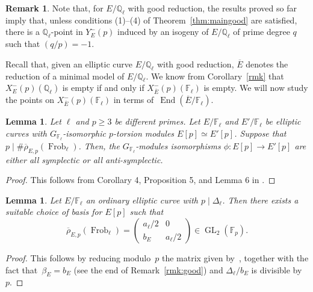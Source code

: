 \documentclass[12pt]{amsart}
\numberwithin{equation}{section}
\newtheorem{lemma}[equation]{Lemma}
\theoremstyle{definition}
\newtheorem{remark}[equation]{Remark}
\newcommand{\F}{\mathbb{F}}
\newcommand{\Q}{\mathbb{Q}}
\newcommand{\rhobar}{{\overline{\rho}}}
\newcommand{\Xp}{X_E^{-}(p)}
\DeclareMathOperator{\GL}{GL}
\DeclareMathOperator{\Frob}{Frob}
\DeclareMathOperator{\End}{End}
\newcommand{\oE}{\overline{E}}
\begin{document}
\begin{remark} \label{rem:isogenies}
Note that, for $E/\Q_\ell$ with good reduction, the results proved so far imply that, unless conditions (1)--(4) of Theorem~\ref{thm:maingood} are satisfied, there is a $\Q_\ell$-point in $Y_E^-(p)$ induced by an isogeny of $E/\Q_\ell$ of prime degree $q$ such that $(q/p)=-1$.
\end{remark}

Recall that, given an elliptic curve $E/\Q_\ell$ with good reduction, $\oE$ denotes the reduction of a minimal model of $E/\Q_\ell$.
We know from Corollary~\ref{rmk} that 
$\Xp(\Q_\ell)$ is empty if and only if $X^-_{\oE}(p)(\F_\ell)$ is empty. We will now study the points on $X^-_{\oE}(p)(\F_\ell)$ 
in terms of~$\End(\oE/\F_\ell)$.


\begin{lemma}\label{lem:samesym} Let $\ell$ and $p \geq 3$ be different primes.
    Let $E / \F_\ell$ and $E' / \F_\ell$ be elliptic curves with $G_{\F_\ell}$-isomorphic $p$-torsion modules $E[p]\simeq E'[p]$.
    Suppose that~$p \mid \#\rhobar_{E,p}(\Frob_\ell)$.
    Then, the $G_{\F_\ell}$-modules isomorphisms $\phi : E[p] \to E'[p]$ are either all symplectic or all anti-symplectic. 
\end{lemma}
\begin{proof}
    This follows from Corollary 4, Proposition 5, and Lemma 6 in \cite{symplectic}.
\end{proof}
\begin{lemma}\label{lem:Centeleghe}
    Let $E / \F_\ell$ an ordinary elliptic curve with $p \mid \Delta_\ell$. Then there exists a suitable choice of basis for $E[p]$ such that
    \begin{equation}\label{eq:cent}
    \rhobar_{E,p}(\Frob_\ell)=\left(\begin{smallmatrix}
				 a_\ell/2 & 0 \\
				b_E & a_\ell/2\end{smallmatrix}\right) \in \GL_2(\F_p). \end{equation}
\end{lemma}
\begin{proof}
    This follows by reducing modulo~$p$ the matrix given by~\cite[Theorem 2]{Centeleghe}, together with the fact that~$\beta_E=b_E$ (see the end of Remark~\ref{rmk:good}) and $\Delta_\ell / b_E$ is divisible by~$p$.
\end{proof}
\end{document}
